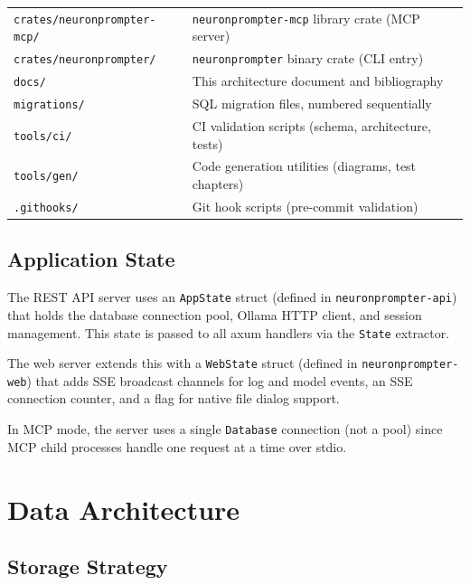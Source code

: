 \documentclass[a4paper, 11pt, oneside]{report}
\begin{document}
\begin{table}[H]
\begin{tabularx}{\textwidth}{l X}
    \texttt{crates/neuronprompter-mcp/}           & \texttt{neuronprompter-mcp} library crate (MCP server) \\
    \texttt{crates/neuronprompter/}               & \texttt{neuronprompter} binary crate (CLI entry) \\
    \texttt{docs/}                 & This architecture document and bibliography \\
    \texttt{migrations/}           & SQL migration files, numbered sequentially \\
    \texttt{tools/ci/}             & CI validation scripts (schema, architecture, tests) \\
    \texttt{tools/gen/}            & Code generation utilities (diagrams, test chapters) \\
    \texttt{.githooks/}            & Git hook scripts (pre-commit validation) \\
    \bottomrule
  \end{tabularx}
\end{table}

\section{Application State}
\label{sec:app-state}

The REST API server uses an \texttt{AppState} struct (defined in
\texttt{neuronprompter-api}) that holds the database connection pool,
Ollama HTTP client, and session management.  This state is passed
to all axum handlers via the \texttt{State} extractor.

The web server extends this with a \texttt{WebState} struct (defined in
\texttt{neuronprompter-web}) that adds SSE broadcast channels for log
and model events, an SSE connection counter, and a flag for native
file dialog support.

In MCP mode, the server uses a single \texttt{Database} connection
(not a pool) since MCP child processes handle one request at a time
over stdio.


\chapter{Data Architecture}
\label{ch:data}

\section{Storage Strategy}
\label{sec:storage-strategy}
\end{document}
